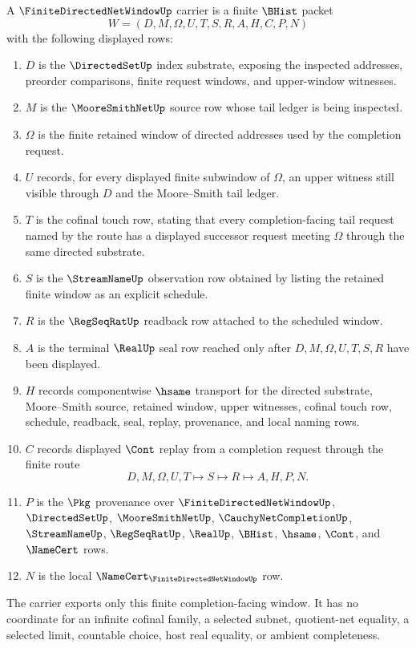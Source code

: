 \begin{definition}\label{def:finite-directed-net-window-carrier}
A $\FiniteDirectedNetWindowUp$ carrier is a finite $\BHist$ packet
$$
W=(D,M,\Omega,U,T,S,R,A,H,C,P,N)
$$
with the following displayed rows:
\begin{enumerate}
\item $D$ is the $\DirectedSetUp$ index substrate, exposing the inspected addresses, preorder comparisons, finite request windows, and upper-window witnesses.
\item $M$ is the $\MooreSmithNetUp$ source row whose tail ledger is being inspected.
\item $\Omega$ is the finite retained window of directed addresses used by the completion request.
\item $U$ records, for every displayed finite subwindow of $\Omega$, an upper witness still visible through $D$ and the Moore--Smith tail ledger.
\item $T$ is the cofinal touch row, stating that every completion-facing tail request named by the route has a displayed successor request meeting $\Omega$ through the same directed substrate.
\item $S$ is the $\StreamNameUp$ observation row obtained by listing the retained finite window as an explicit schedule.
\item $R$ is the $\RegSeqRatUp$ readback row attached to the scheduled window.
\item $A$ is the terminal $\RealUp$ seal row reached only after $D,M,\Omega,U,T,S,R$ have been displayed.
\item $H$ records componentwise $\hsame$ transport for the directed substrate, Moore--Smith source, retained window, upper witnesses, cofinal touch row, schedule, readback, seal, replay, provenance, and local naming rows.
\item $C$ records displayed $\Cont$ replay from a completion request through the finite route
$$
D,M,\Omega,U,T \longmapsto S \longmapsto R \longmapsto A,H,P,N .
$$
\item $P$ is the $\Pkg$ provenance over $\FiniteDirectedNetWindowUp$, $\DirectedSetUp$, $\MooreSmithNetUp$, $\CauchyNetCompletionUp$, $\StreamNameUp$, $\RegSeqRatUp$, $\RealUp$, $\BHist$, $\hsame$, $\Cont$, and $\NameCert$ rows.
\item $N$ is the local $\NameCert_{\FiniteDirectedNetWindowUp}$ row.
\end{enumerate}
The carrier exports only this finite completion-facing window. It has no coordinate for an infinite cofinal family, a selected subnet, quotient-net equality, a selected limit, countable choice, host real equality, or ambient completeness.
\end{definition}

